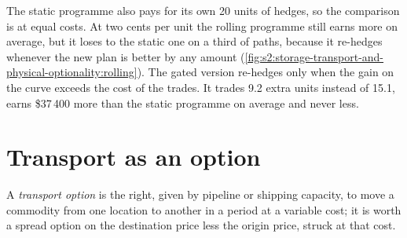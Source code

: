 The static programme also pays for its own 20 units of hedges, so the comparison is at equal costs. At two cents per unit the rolling programme
still earns more on average, but it loses to the static one on a third of paths, because it re-hedges whenever the new plan is better by any amount
(\cref{fig:s2:storage-transport-and-physical-optionality:rolling}). The gated version re-hedges only when the gain on the curve exceeds the cost of the
trades. It trades 9.2 extra units instead of 15.1, earns \$37\,400 more than the static programme on average and never less.

\begin{omfigure}

\label{fig:s2:storage-transport-and-physical-optionality:rolling}
\end{omfigure}

\section{Transport as an option}

\begin{definition}\label{def:s2:storage-transport-and-physical-optionality:transport}
A \emph{transport option} is the right, given by pipeline or shipping capacity, to move a commodity from one location to
another in a period at a variable cost; it is worth a spread option on the destination price less the origin price, struck at that cost.
\end{definition}


